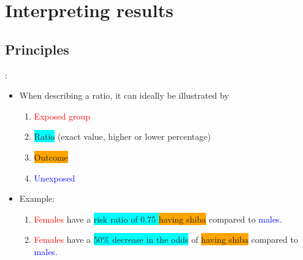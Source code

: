 \section{Interpreting results}
\subsection{Principles}
\begin{frame}{\secname: \subsecname}
\begin{itemize}
\item When describing a ratio, it can ideally be illustrated by 
\begin{enumerate}
	\item \textcolor{red}{Exposed group}
	\item \colorbox{cyan}{Ratio} (exact value, higher or lower percentage)
	\item \colorbox{orange}{Outcome}
	\item \textcolor{blue}{Unexposed}
\end{enumerate}
\item<2|handout:2-> Example:
\begin{enumerate}
\item<2|handout:2-> \textcolor{red}{Females} have a \colorbox{cyan}{risk ratio of 0.75	} \colorbox{orange}{having shiba} compared to \textcolor{blue}{males}.
\item<3|handout:3> \textcolor{red}{Females} have a \colorbox{cyan}{50\% decrease in the odds} of \colorbox{orange}{having shiba} compared to \textcolor{blue}{males}.
\end{enumerate}

\end{itemize}	
\end{frame}

